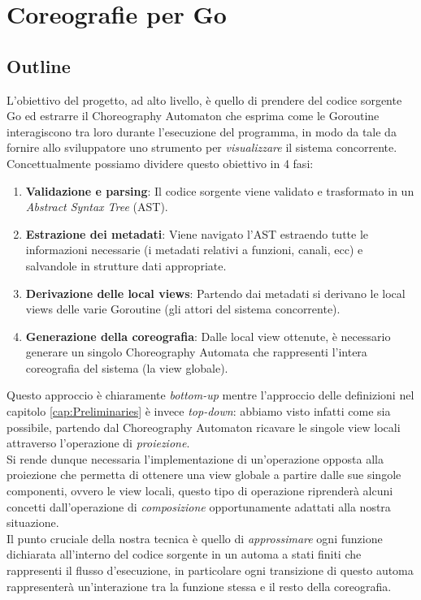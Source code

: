 \chapter{Coreografie per Go}
\section{Outline} \label{sec:GoOutline}
L'obiettivo del progetto, ad alto livello, è quello di prendere del codice sorgente Go ed estrarre il Choreography Automaton che esprima come le Goroutine interagiscono tra loro durante l'esecuzione del programma, in modo da tale da fornire allo sviluppatore uno strumento per \emph{visualizzare} il sistema concorrente.\\
Concettualmente possiamo dividere questo obiettivo in 4 fasi:
\begin{enumerate}
    \item \textbf{Validazione e parsing}: Il codice sorgente viene validato e trasformato in un \emph{Abstract Syntax Tree} (AST).
    \item \textbf{Estrazione dei metadati}: Viene navigato l'AST estraendo tutte le informazioni necessarie (i metadati relativi a funzioni, canali, ecc) e salvandole in strutture dati appropriate.
    \item \textbf{Derivazione delle local views}: Partendo dai metadati si derivano le local views delle varie Goroutine (gli attori del sistema concorrente).
    \item \textbf{Generazione della coreografia}: Dalle local view ottenute, è necessario generare un singolo Choreography Automata che rappresenti l'intera coreografia del sistema (la view globale).
\end{enumerate}
Questo approccio è chiaramente \emph{bottom-up} mentre l'approccio delle definizioni nel capitolo \ref{cap:Preliminaries} è invece \emph{top-down}: abbiamo visto infatti come sia possibile, partendo dal Choreography Automaton ricavare le singole view locali attraverso l'operazione di \emph{proiezione}.\\
Si rende dunque necessaria l'implementazione di un'operazione opposta alla proiezione che permetta di ottenere una view globale a partire dalle sue singole componenti, ovvero le view locali, questo tipo di operazione riprenderà alcuni concetti dall'operazione di \emph{composizione} opportunamente adattati alla nostra situazione. \\
Il punto cruciale della nostra tecnica è quello di \emph{approssimare} ogni funzione dichiarata all'interno del codice sorgente in un automa a stati finiti che rappresenti il flusso d'esecuzione, in particolare ogni transizione di questo automa rappresenterà un'interazione tra la funzione stessa e il resto della coreografia. \bigskip \\
